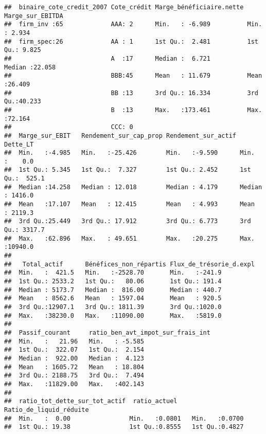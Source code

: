 \documentclass[
]{article}
\begin{document}
\begin{verbatim}
##  binaire_cote_credit_2007 Cote_crédit Marge_bénéficiaire.nette Marge_sur_EBITDA
##  firm_inv :65             AAA: 2      Min.   : -6.989          Min.   : 2.934  
##  firm_spec:26             AA : 1      1st Qu.:  2.481          1st Qu.: 9.825  
##                           A  :17      Median :  6.721          Median :22.058  
##                           BBB:45      Mean   : 11.679          Mean   :26.409  
##                           BB :13      3rd Qu.: 16.334          3rd Qu.:40.233  
##                           B  :13      Max.   :173.461          Max.   :72.164  
##                           CCC: 0                                               
##  Marge_sur_EBIT   Rendement_sur_cap_prop Rendement_sur_actif    Dette_LT      
##  Min.   :-4.985   Min.   :-25.426        Min.   :-9.590      Min.   :    0.0  
##  1st Qu.: 5.345   1st Qu.:  7.327        1st Qu.: 2.452      1st Qu.:  525.1  
##  Median :14.258   Median : 12.018        Median : 4.179      Median : 1416.0  
##  Mean   :17.107   Mean   : 12.415        Mean   : 4.993      Mean   : 2119.3  
##  3rd Qu.:25.449   3rd Qu.: 17.912        3rd Qu.: 6.773      3rd Qu.: 3317.7  
##  Max.   :62.896   Max.   : 49.651        Max.   :20.275      Max.   :10940.0  
##                                                                               
##   Total_actif      Bénéfices_non_répartis Flux_de_trésorie_d.expl
##  Min.   :  421.5   Min.   :-2528.70       Min.   :-241.9         
##  1st Qu.: 2533.2   1st Qu.:   80.06       1st Qu.: 191.4         
##  Median : 5173.7   Median :  816.00       Median : 440.7         
##  Mean   : 8562.6   Mean   : 1597.04       Mean   : 920.5         
##  3rd Qu.:12907.1   3rd Qu.: 1811.39       3rd Qu.:1020.0         
##  Max.   :38230.0   Max.   :11090.00       Max.   :5819.0         
##                                                                  
##  Passif_courant     ratio_ben_avt_impot_sur_frais_int
##  Min.   :   21.96   Min.   : -5.585                  
##  1st Qu.:  322.07   1st Qu.:  2.154                  
##  Median :  922.00   Median :  4.123                  
##  Mean   : 1605.72   Mean   : 18.804                  
##  3rd Qu.: 2188.75   3rd Qu.:  7.494                  
##  Max.   :11829.00   Max.   :402.143                  
##                                                      
##  ratio_tot_dette_sur_tot_actif  ratio_actuel    Ratio_de_liquid_réduite
##  Min.   :  0.00                Min.   :0.0801   Min.   :0.0700         
##  1st Qu.: 19.38                1st Qu.:0.8555   1st Qu.:0.4827         

\end{verbatim}
\end{document}
